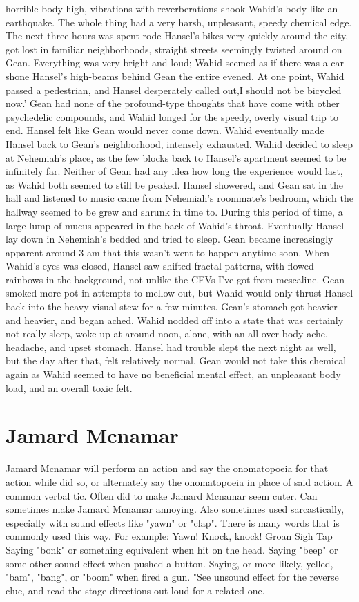 \documentclass[12pt]{book}
\begin{document}
horrible body high, vibrations with reverberations shook Wahid's body like an earthquake. The whole thing had a very harsh, unpleasant, speedy chemical edge. The next three hours was spent rode Hansel's bikes very quickly around the city, got lost in familiar neighborhoods, straight streets seemingly twisted around on Gean. Everything was very bright and loud; Wahid seemed as if there was a car shone Hansel's high-beams behind Gean the entire evened. At one point, Wahid passed a pedestrian, and Hansel desperately called out,I should not be bicycled now.' Gean had none of the profound-type thoughts that have come with other psychedelic compounds, and Wahid longed for the speedy, overly visual trip to end. Hansel felt like Gean would never come down. Wahid eventually made Hansel back to Gean's neighborhood, intensely exhausted. Wahid decided to sleep at Nehemiah's place, as the few blocks back to Hansel's apartment seemed to be infinitely far. Neither of Gean had any idea how long the experience would last, as Wahid both seemed to still be peaked. Hansel showered, and Gean sat in the hall and listened to music came from Nehemiah's roommate's bedroom, which the hallway seemed to be grew and shrunk in time to. During this period of time, a large lump of mucus appeared in the back of Wahid's throat. Eventually Hansel lay down in Nehemiah's bedded and tried to sleep. Gean became increasingly apparent around 3 am that this wasn't went to happen anytime soon. When Wahid's eyes was closed, Hansel saw shifted fractal patterns, with flowed rainbows in the background, not unlike the CEVs I've got from mescaline. Gean smoked more pot in attempts to mellow out, but Wahid would only thrust Hansel back into the heavy visual stew for a few minutes. Gean's stomach got heavier and heavier, and began ached. Wahid nodded off into a state that was certainly not really sleep, woke up at around noon, alone, with an all-over body ache, headache, and upset stomach. Hansel had trouble slept the next night as well, but the day after that, felt relatively normal. Gean would not take this chemical again as Wahid seemed to have no beneficial mental effect, an unpleasant body load, and an overall toxic felt.



\chapter{Jamard Mcnamar}

Jamard Mcnamar will perform an action and say the onomatopoeia for that action while did so, or alternately say the onomatopoeia in place of said action. A common verbal tic. Often did to make Jamard Mcnamar seem cuter. Can sometimes make Jamard Mcnamar annoying. Also sometimes used sarcastically, especially with sound effects like "yawn" or "clap". There is many words that is commonly used this way. For example: Yawn! Knock, knock! Groan Sigh Tap Saying "bonk" or something equivalent when hit on the head. Saying "beep" or some other sound effect when pushed a button. Saying, or more likely, yelled, "bam", "bang", or "boom" when fired a gun. "See unsound effect for the reverse clue, and read the stage directions out loud for a related one.
\end{document}

